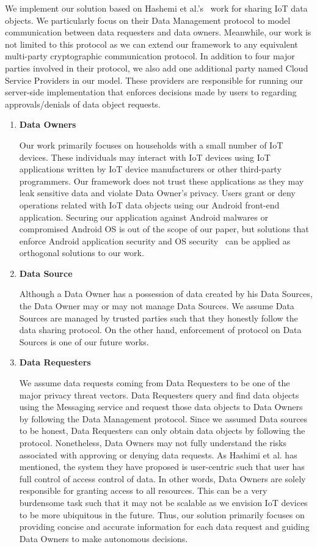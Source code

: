 We implement our solution based on Hashemi et al.'s~\cite{campbell} work for sharing IoT data objects. We particularly focus on their Data Management protocol to model communication between data requesters and data owners. Meanwhile, our work is not limited to this protocol as we can extend our framework to any equivalent multi-party cryptographic communication protocol. In addition to four major parties involved in their protocol, we also add one additional party named Cloud Service Providers in our model. These providers are responsible for running our server-side implementation that enforces decisions made by users to regarding approvals/denials of data object requests. 

\begin{enumerate}
\item \textbf {Data Owners} 

Our work primarily focuses on households with a small number of IoT devices. These individuals may interact with IoT devices using IoT applications written by IoT device manufacturers or other third-party programmers. Our framework does not trust these applications as they may leak sensitive data and violate Data Owner's privacy. Users grant or deny operations related with IoT data objects using our Android front-end  application. Securing our application against Android malwares or compromised Android OS is out of the scope of our paper, but solutions that enforce Android application security and OS security~\cite{tz} can be applied as orthogonal solutions to our work. 

\item \textbf{Data Source} 

Although a Data Owner has a possession of data created by his Data Sources, the Data Owner may or may not manage Data Sources. We assume Data Sources are managed by trusted parties such that they honestly follow the data sharing protocol. On the other hand, enforcement of protocol on Data Sources is one of our future works. 

\item \textbf {Data Requesters}

We assume data requests coming from Data Requesters to be one of the major privacy threat vectors. Data Requesters query and find data objects using the Messaging service and request those data objects to Data Owners by following the Data Management protocol. Since we assumed Data sources to be honest, Data Requesters can only obtain data objects by following the protocol. Nonetheless, Data Owners may not fully understand the risks associated with approving or denying data requests. As Hashimi et al. has mentioned, the system they have proposed is user-centric such that user has full control of access control of data. In other words, Data Owners are solely responsible for granting access to all resources. This can be a very burdensome task such that it may not be scalable as we envision IoT devices to be more ubiquitous in the future. Thus, our solution primarily focuses on providing concise and accurate information for each data request and guiding Data Owners to make autonomous decisions.


\end{enumerate}

